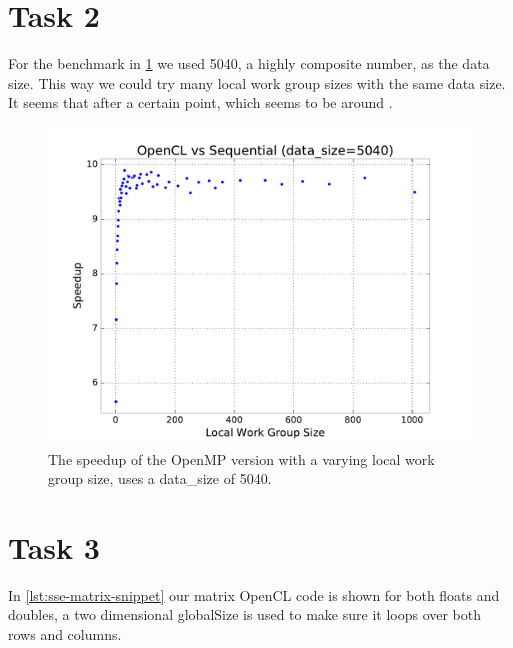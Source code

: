 \documentclass[final]{report}
\begin{document}
\section{Task 2}
For the benchmark in \cref{fig:opencl-localsize-sweep} we used 5040, a highly composite number, as the data size.
This way we could try many local work group sizes with the same data size.
It seems that after a certain point, which seems to be around .
\begin{figure}[H]
\centering
    \includegraphics[width=\linewidth]{resources/opencl-localsize-sweep.pdf}
    \caption{The speedup of the OpenMP version with a varying local work group size, uses a data\_size of 5040.}
    \label{fig:opencl-localsize-sweep}
\end{figure}
\section{Task 3}
In \cref{lst:sse-matrix-snippet} our matrix OpenCL code is shown for both floats and doubles, a two dimensional globalSize is used to make sure it loops over both rows and columns.

\end{document}
